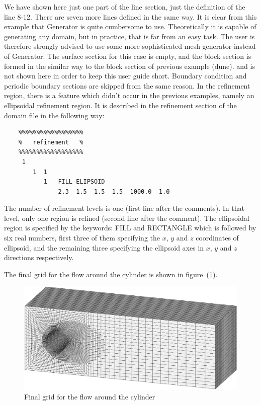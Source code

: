 \documentclass[10pt]{article}
\newcommand*{\tc}{\ttfamily} %
\newcommand*{\tn}{\sffamily} %
\begin{document}
    \normalsize
    We have shown here just one part of the line section, just
    the definition of the line 8-12. There
    are seven more lines defined in the same way. It is clear 
    from this example that {\tn Generator} is quite cumbersome
    to use. Theoretically it is capable of generating any domain,
    but in practice, that is far from an easy task. The user
    is therefore strongly advised to use some more sophisticated
    mesh generator instead of {\tn Generator}. The surface section
    for this case is empty, and the block section is formed in 
    the similar way to the block section of previous example (dune).
    and is not shown here in order to keep this user guide short.
    Boundary condition and periodic boundary sections are skipped
    from the same reason. In the refinement region, there is a
    feature which didn't occur in the previous examples, namely
    an ellipsoidal refinement region. It is described in the
    refinement section of the domain file in the following way:
    \small
    \begin{verbatim}
    %%%%%%%%%%%%%%%%%%
    %   refinement   %
    %%%%%%%%%%%%%%%%%%
     1
        1  1
           1   FILL ELIPSOID
               2.3  1.5  1.5  1.5  1000.0  1.0
    \end{verbatim}
    \normalsize
    The number of refinement levels is one (first line after
    the comments). In that level, only one region is refined
    (second line after the comment). The ellipsoidal region
    is specified by the keywords: {\tc FILL} and {\tc RECTANGLE}
    which is followed by six real numbers, first three of them
    specifying the $x$, $y$ and $z$ coordinates of ellipsoid, and the
    remaining three specifying the ellipsoid axes in $x$, $y$ and $z$
    directions respectively.  

    The final grid for the flow around the cylinder is shown in
    figure~(\ref{cylfinal_p10_m30_p10}).
    \begin{figure}
    \centering
    \includegraphics[scale=0.6]{cylfinal_p10_m30_p10.eps}
    \caption{Final grid for the flow around the cylinder}
    \label{cylfinal_p10_m30_p10}
    \end{figure}
\end{document}
